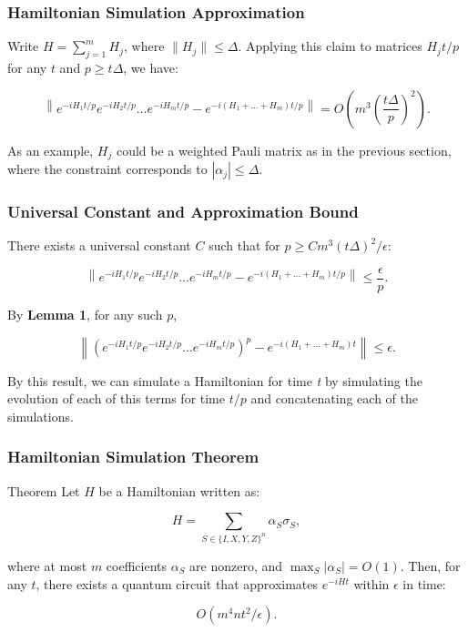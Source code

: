 \documentclass[aspectratio=169,xcolor=dvipsnames]{beamer}
\begin{document}
\begin{frame}
    \frametitle{Hamiltonian Simulation Approximation}

    Write \( H = \sum_{j=1}^{m} H_j \), where \( \|H_j\| \leq \Delta \).  
    Applying this claim to matrices \( H_j t/p \) for any \( t \) and \( p \geq t \Delta \), we have: \pause
    
    \[
    \left\| e^{-iH_1 t/p} e^{-iH_2 t/p} \dots e^{-iH_m t/p} - e^{-i(H_1+\dots+H_m)t/p} \right\| = O \left( m^3 \left( \frac{t\Delta}{p} \right)^2 \right).
    \]\pause

    As an example, $H_j$ could be a weighted Pauli matrix as in the previous section, where the constraint corresponds to $|\alpha_j| \leq \Delta$.

\end{frame}

\begin{frame}
    \frametitle{Universal Constant and Approximation Bound}

    There exists a universal constant \( C \) such that for \( p \geq Cm^3 (t \Delta)^2 / \epsilon \): \pause

    \[
    \left\| e^{-iH_1 t/p} e^{-iH_2 t/p} \dots e^{-iH_m t/p} - e^{-i(H_1+\dots+H_m)t/p} \right\| \leq \frac{\epsilon}{p}.
    \]\pause

    By \textbf{Lemma 1}, for any such \( p \),\pause

    \[
    \left\| \left( e^{-iH_1 t/p} e^{-iH_2 t/p} \dots e^{-iH_m t/p} \right)^p - e^{-i(H_1+\dots+H_m)t} \right\| \leq \epsilon.
    \]\pause

    By this result, we can simulate a Hamiltonian for time \textit{t} by simulating the evolution of each of this terms for time $t/p$ and concatenating each of the simulations.

\end{frame}

\begin{frame}
    \frametitle{Hamiltonian Simulation Theorem}

    \begin{alertblock}{Theorem}
         Let \( H \) be a Hamiltonian written as:

        \[
        H = \sum_{S \in \{I, X, Y, Z\}^n} \alpha_S \sigma_S,
        \]
    
        where at most \( m \) coefficients \( \alpha_S \) are nonzero, and \( \max_S |\alpha_S| = O(1) \).  
        Then, for any \( t \), there exists a quantum circuit that approximates \( e^{-iHt} \) within \( \epsilon \) in time:
    
        \[
        O(m^4 n t^2 / \epsilon).
        \]
    
    \end{alertblock}

\end{frame}
\end{document}
